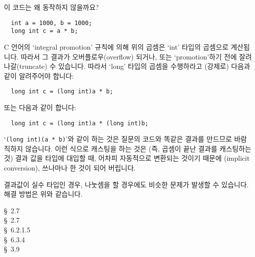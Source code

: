 \begin{faq}
	이 코드는 왜 동작하지 않을까요?

\begin{verbatim}
  int a = 1000, b = 1000;
  long int c = a * b;
\end{verbatim}

\A
	C 언어의 `integral promotion' 규칙에 의해 위의 곱셈은 `int' 타입의
	곱셈으로 계산됩니다.  따라서 그 결과가 오버플로우(overflow) 되거나,
	또는
	`promotion'하기 전에 잘려나갈(truncate) 수 있습니다.  따라서 `long'
	타입의 곱셈을 수행하라고 (강제로) 다음과 같이 알려주어야 합니다:

\begin{verbatim}
  long int c = (long int)a * b;
\end{verbatim}

        또는 다음과 같이 합니다:

\begin{verbatim}
  long int c = (long int)a * (long int)b;
\end{verbatim}

	`\verb+(long int)(a * b)+'와 같이 하는 것은 질문의 코드와 똑같은 결과를
	만드므로 바람직하지 않습니다. 이런 식으로 캐스팅을 하는 것은 (즉, 곱셈이 끝난 결과를
        캐스팅하는 것) 결과 값을  타입에 대입할 때, 어차피 자동적으로
        변환되는 것이기 때문에 (implicit conversion), 쓰나마나 한 것이 되어 버립니다.

	결과값이 실수 타입인 경우, 나눗셈을 할 경우에도 비슷한 문제가 발생할 수
	있습니다.  해결 방법은 위와 같습니다.

\R
	\cite{kr1} \S\ 2.7  \\
	\cite{kr2} \S\ 2.7  \\
	\cite{c89} \S\ 6.2.1.5 \\
	\cite{hs} \S\ 6.3.4  \\
	\cite{ctp} \S\ 3.9 
\end{faq}

